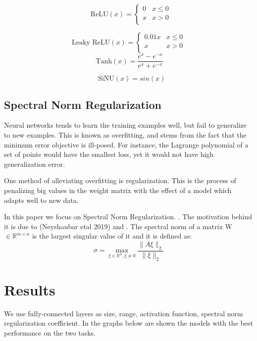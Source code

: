 \documentclass{article}
\begin{document}
    $$ \ \ \ \text{ReLU}(x) = \begin{cases} 
                    0 & x \leq 0 \\
                    x & x > 0 \\
                 \end{cases}$$
    
    $$\text{Leaky ReLU}(x) = \begin{cases} 
                    0.01x & x \leq 0 \\
                    x & x > 0 \\
                 \end{cases}$$
    $$\ \text{Tanh}(x) = \frac{e^x - e^{-x}}{e^x + e^{-x}}$$
    
    $$\ \ \ \ \text{SiNU}(x) = sin(x)$$
    
    \subsection{Spectral Norm Regularization}
    
    Neural networks tends to learn the training examples well, but fail to generalize to new examples. This is known as overfitting, and stems from the fact that the minimum error objective is ill-posed. For instance, the Lagrange polynomial of a set of points would have the smallest loss, yet it would not have high generalization error.
    
    One method of alleviating overfitting is regularization. This is the process of penalizing big values in the weight matrix with the effect of a model which adapts well to new data.  
    
    In this paper we focus on Spectral Norm Regularization. \cite{spectral}. The motivation behind it is due to (Neyshaubar etal 2019)\cite{Neyshaubar} and \cite{Arora}. The spectral norm of a matrix W $ \in \mathbb{R}^ {m\times n} $ is the largest singular value of it and it is defined as: 
    $$\sigma = \max_{\xi \in \mathbb{R}^ {n}, \xi \neq 0}\dfrac{ \|A\xi\|_2}{\|\xi\|_2}$$
    
    
    

\section{Results}
\label{Results}
We use fully-connected layers as size, range, activation function, spectral norm regularization coefficient. 
In the graphs below are shown the models with the best performance on the two tasks.
\end{document}
